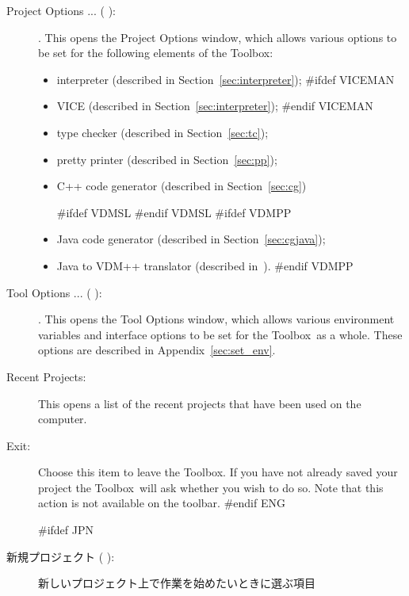 \documentclass[\pformat,12pt]{article}
\newcommand{\Toolbox}{Toolbox}
\newcommand{\Toolbox}{Toolbox}
\newcommand{\guicmd}[1]{{\sf #1}}
\newcommand{\guicmd}[1]{{\gt #1}}
\begin{document}
\begin{description}
\item[\guicmd{Project Options ...} (\hspace{-1.5mm}
):].
  This opens the \guicmd{Project Options} window, which allows various options
  to be set for the following elements of the \Toolbox:
  \begin{itemize}
    \item \guicmd{interpreter} (described in
  Section~\ref{sec:interpreter});
#ifdef VICEMAN
    \item \guicmd{VICE} (described in
  Section~\ref{sec:interpreter});
#endif VICEMAN
    \item \guicmd{type checker}  (described in Section~\ref{sec:tc});
    \item \guicmd{pretty printer}  (described in Section~\ref{sec:pp});
    \item \guicmd{C++ code generator} (described in Section~\ref{sec:cg})%

#ifdef VDMSL
#endif VDMSL
#ifdef VDMPP
    \item \guicmd{Java code generator}  (described in Section~\ref{sec:cgjava});
    \item \guicmd{Java to VDM++ translator}  (described in~\cite{Java2VDMMan-CSK}). 
#endif VDMPP
  \end{itemize}

\item[\guicmd{Tool Options ...} (\hspace{-1.5mm}
):].
  This opens the \guicmd{Tool Options} window, which allows various
  environment variables and interface options to be set for the
  \Toolbox\ as a whole. These options are described in
  Appendix~\ref{sec:set_env}. 

\item[\guicmd{Recent Projects}:]
  This opens a list of the recent projects that have been used on the
  computer.

\item[\guicmd{Exit}:] Choose this item to leave the \Toolbox. If you
  have not already saved your project the \Toolbox\ will ask whether
  you wish to do so. Note that this action is not available on the
  toolbar. 
#endif ENG

#ifdef JPN
\item[\guicmd{新規プロジェクト} (\hspace{-1.8mm}
):]
  新しいプロジェクト上で作業を始めたいときに選ぶ項目


\end{description}
\end{document}
